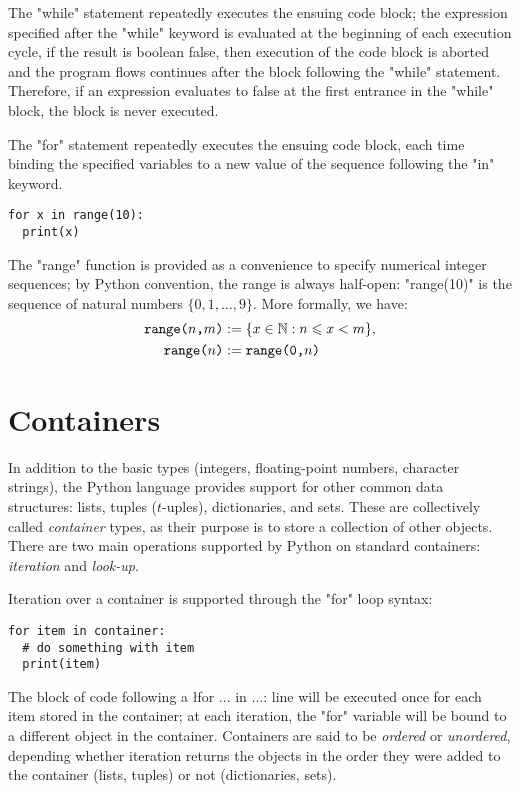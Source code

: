 {The "while" statement repeatedly executes the ensuing code block;
the expression specified after the "while" keyword is evaluated
at the beginning of each execution cycle, if the result is boolean
false, then execution of the code block is aborted and the program
flows continues after the block following the "while" statement.
Therefore, if an expression evaluates to false at the first entrance
in the "while" block, the block is never executed.

The "for" statement repeatedly executes the ensuing code block,
each time binding the specified variables to a new value of the
sequence following the "in" keyword.
\begin{lstlisting}
for x in range(10):
  print(x)
\end{lstlisting}
The "range" function is provided as a convenience to specify
numerical integer sequences; by Python convention, the range is always
half-open: "range(10)" is the sequence of natural numbers $\{0,
1, \ldots, 9\}$.  More formally, we have:
\begin{align*}
  \text{\ttfamily range($n$,$m$)} &:= \{ x \in \mathbb{N} : n \leqslant x < m \},
  \\
  \text{\ttfamily range($n$)} &:= \text{\ttfamily range(0,$n$)}
\end{align*}



\section{Containers}
\label{sec:containers}

In addition to the basic types (integers, floating-point numbers,
character strings), the Python language provides support for other
common data structures: lists, tuples ($t$-uples), dictionaries, and
sets.  These are collectively called \emph{container} types, as their
purpose is to store a collection of other objects.
There are two main operations supported by Python on standard
containers: \emph{iteration} and \emph{look-up}.

Iteration over a container is supported through the "for" loop
syntax:
\begin{lstlisting}
for item in container:
  # do something with item
  print(item)
\end{lstlisting}
The block of code following a \l{for ... in ...:} line will be
executed once for each item stored in the container; at each
iteration, the "for" variable will be bound to a different object in
the container.  Containers are said to be \emph{ordered} or
\emph{unordered}, depending whether iteration returns the objects in
the order they were added to the container (lists, tuples) or not
(dictionaries, sets).

}
